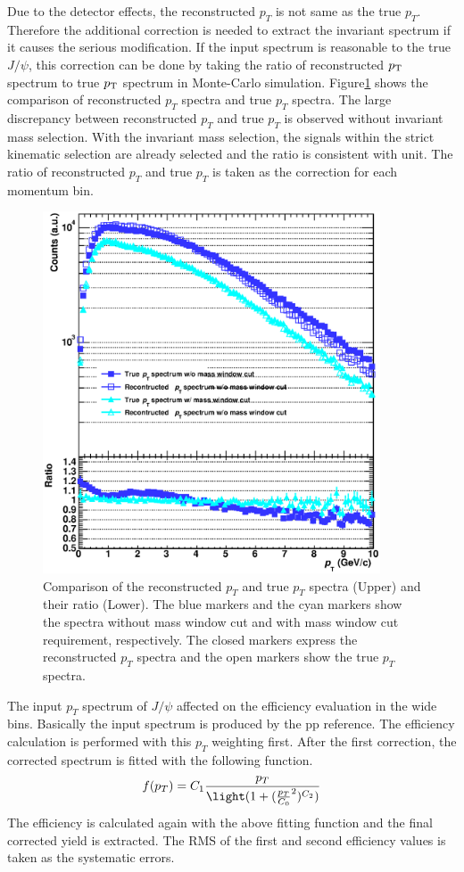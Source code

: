 Due to the detector effects, the reconstructed $p_{T}$ is not same as the true $p_{T}$. 
Therefore the additional correction is needed to extract the invariant spectrum if it causes the serious modification. 
If the input spectrum is reasonable to the true $J/\psi$, this correction can be done by taking the ratio of reconstructed $p_{\rm{T}}$ spectrum to true $p_{\rm{T}}$ spectrum in Monte-Carlo simulation.
Figure\ref{fig_4_jpsieff_cutdep} shows the comparison of reconstructed $p_{T}$ spectra and true $p_{T}$ spectra. 
The large discrepancy between reconstructed $p_{T}$ and true $p_{T}$ is observed without invariant mass selection. 
With the invariant mass selection, the signals within the strict kinematic selection are already selected and the ratio is consistent with unit.
The ratio of reconstructed $p_{T}$ and true $p_{T}$ is taken as the correction for each momentum bin.  
\begin{figure}[!h]
  \centering
  \includegraphics[width=10cm]{chap4/figure/Correction/JpsiRecPtSpectra.eps}
  \caption{Comparison of the reconstructed $p_{T}$ and true $p_{T}$ spectra (Upper) and their ratio (Lower). The blue markers and the cyan markers show the spectra without mass window cut and with mass window cut requirement, respectively. The closed markers express the reconstructed $p_{T}$ spectra and the open markers show the true $p_{T}$ spectra.}
  \label{fig_4_jpsieff_cutdep}
\end{figure}

The input $p_{T}$ spectrum of $J/\psi$ affected on the efficiency evaluation in the wide bins. 
Basically the input spectrum is produced by the pp reference. 
The efficiency calculation is performed with this $p_{T}$ weighting first. 
After the first correction, the corrected spectrum is fitted with the following function. 
\begin{equation}
  f(p_{T}) = C_{1}\frac{p_{T}}{\light( 1+ (\frac{p_{T}}{C_{0}}^{2})^{C_{2}})}
\end{equation}
The efficiency is calculated again with the above fitting function and the final corrected yield is extracted. 
The RMS of the first and second efficiency values is taken as the systematic errors. 


